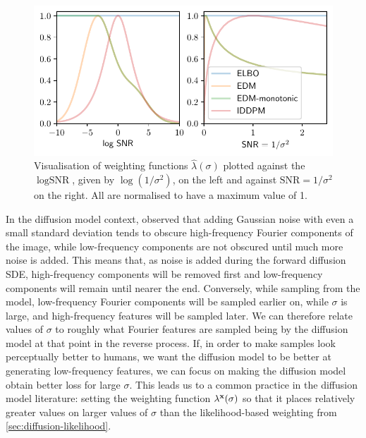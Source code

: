 \begin{figure}
    \centering
    \includegraphics[width=\textwidth]{figs/thesis/diffusion_weighting.pdf}
    \caption{Visualisation of weighting functions $\hat{\lambda}(\sigma)$ plotted against the $\log \text{SNR}$, given by $\log(1/\sigma^2)$, on the left and against $\text{SNR} = 1/\sigma^2$ on the right. All are normalised to have a maximum value of 1.}
    \label{fig:diffusion-weighting}
\end{figure}

In the diffusion model context, \citet{yang2023diffusion} observed that adding Gaussian noise with even a small standard deviation tends to obscure high-frequency Fourier components of the image, while low-frequency components are not obscured until much more noise is added. This means that, as noise is added during the forward diffusion SDE, high-frequency components will be removed first and low-frequency components will remain until nearer the end. 
Conversely, while sampling from the model, low-frequency Fourier components will be sampled earlier on, while $\sigma$ is large, and high-frequency features will be sampled later. 
We can therefore relate values of $\sigma$ to roughly what Fourier features are sampled being by the diffusion model at that point in the reverse process. If, in order to make samples look perceptually better to humans, we want the diffusion model to be better at generating low-frequency features, we can focus on making the diffusion model obtain better loss for large $\sigma$. This leads us to a common practice in the diffusion model literature: setting the weighting function $\lambda^{\mathbf{x}}(\sigma)$ so that it places relatively greater values on larger values of $\sigma$ than the likelihood-based weighting from \cref{sec:diffusion-likelihood}.

